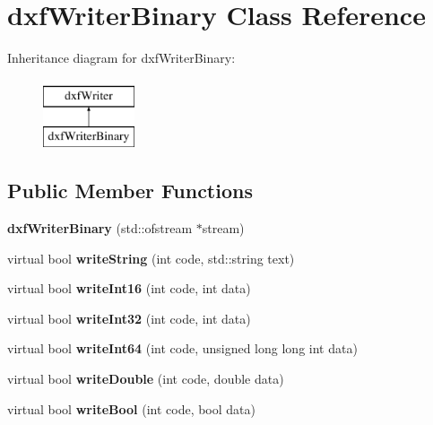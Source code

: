 \hypertarget{classdxfWriterBinary}{\section{dxf\-Writer\-Binary Class Reference}
\label{classdxfWriterBinary}
}
Inheritance diagram for dxf\-Writer\-Binary\-:\begin{figure}[H]
\begin{center}
\leavevmode
\includegraphics[height=2.000000cm]{classdxfWriterBinary}
\end{center}
\end{figure}
\subsection*{Public Member Functions}
\begin{DoxyCompactItemize}
\item 
\hypertarget{classdxfWriterBinary_a01951a5efab3bd5de82e07e57981cf7c}{{\bfseries dxf\-Writer\-Binary} (std\-::ofstream $\ast$stream)}\label{classdxfWriterBinary_a01951a5efab3bd5de82e07e57981cf7c}

\item 
\hypertarget{classdxfWriterBinary_ad76acaad6af6d02fddb49d30cb5a2a4b}{virtual bool {\bfseries write\-String} (int code, std\-::string text)}\label{classdxfWriterBinary_ad76acaad6af6d02fddb49d30cb5a2a4b}

\item 
\hypertarget{classdxfWriterBinary_a874760c1d6f6235880fa74a22dea4b2e}{virtual bool {\bfseries write\-Int16} (int code, int data)}\label{classdxfWriterBinary_a874760c1d6f6235880fa74a22dea4b2e}

\item 
\hypertarget{classdxfWriterBinary_af3684ce45f3067bfde3ed9a5401999eb}{virtual bool {\bfseries write\-Int32} (int code, int data)}\label{classdxfWriterBinary_af3684ce45f3067bfde3ed9a5401999eb}

\item 
\hypertarget{classdxfWriterBinary_a5f19943d77b5b851276b232390b018e3}{virtual bool {\bfseries write\-Int64} (int code, unsigned long long int data)}\label{classdxfWriterBinary_a5f19943d77b5b851276b232390b018e3}

\item 
\hypertarget{classdxfWriterBinary_aca675af0d16479b2b03b58688796f68c}{virtual bool {\bfseries write\-Double} (int code, double data)}\label{classdxfWriterBinary_aca675af0d16479b2b03b58688796f68c}

\item 
\hypertarget{classdxfWriterBinary_aabcb679f4bd702dad813a0bdb755abae}{virtual bool {\bfseries write\-Bool} (int code, bool data)}\label{classdxfWriterBinary_aabcb679f4bd702dad813a0bdb755abae}

\end{DoxyCompactItemize}
